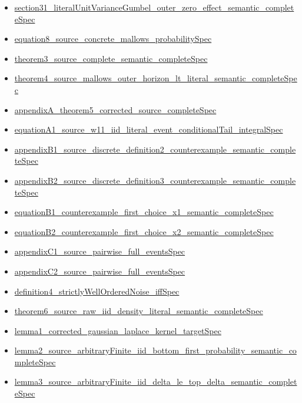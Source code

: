 \documentclass[10pt]{article}
\begin{document}
\begin{itemize}[leftmargin=1.2em]
\begin{itemize}[leftmargin=1.2em]
\item \hyperlink{source-claim-0156e1eedd228cc4}{section31\_literalUnitVarianceGumbel\_outer\_zero\_effect\_semantic\_completeSpec}
\item \hyperlink{source-claim-8dd2c310e7ffc8a6}{equation8\_source\_concrete\_mallows\_probabilitySpec}
\item \hyperlink{source-claim-fd702590ac30f669}{theorem3\_source\_complete\_semantic\_completeSpec}
\item \hyperlink{source-claim-e42fc5562761542b}{theorem4\_source\_mallows\_outer\_horizon\_lt\_literal\_semantic\_completeSpec}
\item \hyperlink{source-claim-54f72d882fb14d8c}{appendixA\_theorem5\_corrected\_source\_completeSpec}
\item \hyperlink{source-claim-9835a680c6142d09}{equationA1\_source\_w11\_iid\_literal\_event\_conditionalTail\_integralSpec}
\item \hyperlink{source-claim-aa9b8f734e8009d3}{appendixB1\_source\_discrete\_definition2\_counterexample\_semantic\_completeSpec}
\item \hyperlink{source-claim-8c4914b3b2e7a592}{appendixB2\_source\_discrete\_definition3\_counterexample\_semantic\_completeSpec}
\item \hyperlink{source-claim-36e8cf848060682f}{equationB1\_counterexample\_first\_choice\_x1\_semantic\_completeSpec}
\item \hyperlink{source-claim-a3b878a82854afb8}{equationB2\_counterexample\_first\_choice\_x2\_semantic\_completeSpec}
\item \hyperlink{source-claim-34bc63da82092219}{appendixC1\_source\_pairwise\_full\_eventsSpec}
\item \hyperlink{source-claim-6a2a92d325b21a46}{appendixC2\_source\_pairwise\_full\_eventsSpec}
\item \hyperlink{source-claim-d11ceae944c696a3}{definition4\_strictlyWellOrderedNoise\_iffSpec}
\item \hyperlink{source-claim-231c9ba63e6b1424}{theorem6\_source\_raw\_iid\_density\_literal\_semantic\_completeSpec}
\item \hyperlink{source-claim-d7ed4659ca9b332e}{lemma1\_corrected\_gaussian\_laplace\_kernel\_targetSpec}
\item \hyperlink{source-claim-e077005933af7923}{lemma2\_source\_arbitraryFinite\_iid\_bottom\_first\_probability\_semantic\_completeSpec}
\item \hyperlink{source-claim-a48d69bf76046da3}{lemma3\_source\_arbitraryFinite\_iid\_delta\_le\_top\_delta\_semantic\_completeSpec}

\end{itemize}
\end{itemize}
\end{document}
